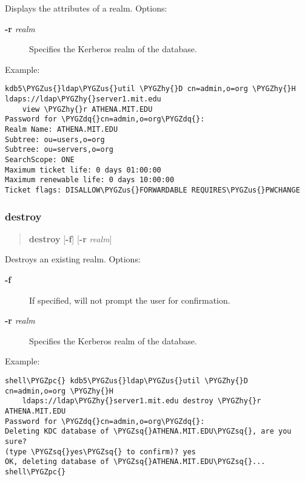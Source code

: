 \documentclass[letterpaper,10pt,english]{sphinxmanual}
\def\PYGZus{\char`\_}
\def\PYGZpc{\char`\%}
\def\PYGZhy{\char`\-}
\def\PYGZsq{\char`\'}
\def\PYGZdq{\char`\"}
\begin{document}
Displays the attributes of a realm.  Options:
\begin{description}
\item[{\textbf{-r} \emph{realm}}] \leavevmode
Specifies the Kerberos realm of the database.

\end{description}

Example:

\begin{Verbatim}[commandchars=\\\{\}]
kdb5\PYGZus{}ldap\PYGZus{}util \PYGZhy{}D cn=admin,o=org \PYGZhy{}H ldaps://ldap\PYGZhy{}server1.mit.edu
    view \PYGZhy{}r ATHENA.MIT.EDU
Password for \PYGZdq{}cn=admin,o=org\PYGZdq{}:
Realm Name: ATHENA.MIT.EDU
Subtree: ou=users,o=org
Subtree: ou=servers,o=org
SearchScope: ONE
Maximum ticket life: 0 days 01:00:00
Maximum renewable life: 0 days 10:00:00
Ticket flags: DISALLOW\PYGZus{}FORWARDABLE REQUIRES\PYGZus{}PWCHANGE
\end{Verbatim}


\subsubsection{destroy}
\label{admin/admin_commands/kdb5_ldap_util:destroy}\label{admin/admin_commands/kdb5_ldap_util:kdb5-ldap-util-view-end}\label{admin/admin_commands/kdb5_ldap_util:kdb5-ldap-util-destroy}\begin{quote}

\textbf{destroy} {[}\textbf{-f}{]} {[}\textbf{-r} \emph{realm}{]}
\end{quote}

Destroys an existing realm. Options:
\begin{description}
\item[{\textbf{-f}}] \leavevmode
If specified, will not prompt the user for confirmation.

\item[{\textbf{-r} \emph{realm}}] \leavevmode
Specifies the Kerberos realm of the database.

\end{description}

Example:

\begin{Verbatim}[commandchars=\\\{\}]
shell\PYGZpc{} kdb5\PYGZus{}ldap\PYGZus{}util \PYGZhy{}D cn=admin,o=org \PYGZhy{}H
    ldaps://ldap\PYGZhy{}server1.mit.edu destroy \PYGZhy{}r ATHENA.MIT.EDU
Password for \PYGZdq{}cn=admin,o=org\PYGZdq{}:
Deleting KDC database of \PYGZsq{}ATHENA.MIT.EDU\PYGZsq{}, are you sure?
(type \PYGZsq{}yes\PYGZsq{} to confirm)? yes
OK, deleting database of \PYGZsq{}ATHENA.MIT.EDU\PYGZsq{}...
shell\PYGZpc{}
\end{Verbatim}
\end{document}
